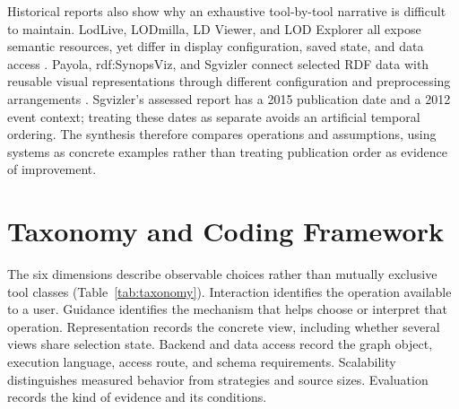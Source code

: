 \documentclass[manuscript,review,screen]{acmart}
\begin{document}
Historical reports also show why an exhaustive tool-by-tool narrative is difficult to maintain. LodLive, LODmilla, LD Viewer, and LOD Explorer all expose semantic resources, yet differ in display configuration, saved state, and data access \citep{2012_Camarda_LodLive_exploring,2014_AMA_LODmilla_Shared,2014_Lukovnikov_LD_Viewer,2018_Jacksi_LOD_Explorer}. Payola, rdf:SynopsViz, and Sgvizler connect selected RDF data with reusable visual representations through different configuration and preprocessing arrangements \citep{2013_Klimek_Payola_collaborative,2014_Bikakis_rdfSynopsViz_a,2015_Skjaeveland_Sgvizler_a}. Sgvizler's assessed report has a 2015 publication date and a 2012 event context; treating these dates as separate avoids an artificial temporal ordering. The synthesis therefore compares operations and assumptions, using systems as concrete examples rather than treating publication order as evidence of improvement.

\section{Taxonomy and Coding Framework}
The six dimensions describe observable choices rather than mutually exclusive tool classes (Table~\ref{tab:taxonomy}). Interaction identifies the operation available to a user. Guidance identifies the mechanism that helps choose or interpret that operation. Representation records the concrete view, including whether several views share selection state. Backend and data access record the graph object, execution language, access route, and schema requirements. Scalability distinguishes measured behavior from strategies and source sizes. Evaluation records the kind of evidence and its conditions.
\end{document}
